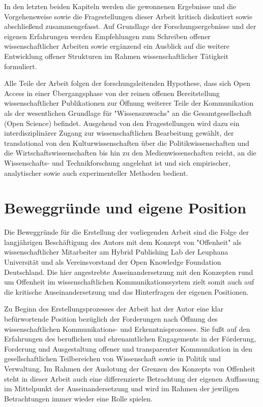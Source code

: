 In den letzten beiden Kapiteln werden die gewonnenen Ergebnisse und die Vorgehensweise sowie die Fragestellungen dieser Arbeit kritisch diskutiert sowie abschließend zusammengefasst. Auf Grundlage der Forschungsergebnisse und der eigenen Erfahrungen werden Empfehlungen zum Schreiben offener wissenschaftlicher Arbeiten sowie ergänzend ein Ausblick auf die weitere Entwicklung offener Strukturen im Rahmen wissenschaftlicher Tätigkeit formuliert.

Alle Teile der Arbeit folgen der forschungsleitenden Hypothese, dass sich Open Access in einer Übergangsphase von der reinen offenen Bereitstellung wissenschaftlicher Publikationen zur Öffnung weiterer Teile der Kommunikation als der wesentlichen Grundlage für "Wissenszuwachs" \cite[:157]{Luhmann_1998} an die Gesamtgesellschaft (Open Science) befindet. Ausgehend von den Fragestellungen wird dazu ein interdisziplinärer Zugang zur wissenschaftlichen Bearbeitung gewählt, der translational von den Kulturwissenschaften über die Politikwissenschaften und die Wirtschaftswissenschaften bis hin zu den Medienwissenschaften reicht, an die Wissenschafts- und Technikforschung angelehnt ist und sich empirischer, analytischer sowie auch experimenteller Methoden bedient.

\section{Beweggründe und eigene Position}

Die Beweggründe für die Erstellung der vorliegenden Arbeit sind die Folge der langjährigen Beschäftigung des Autors mit dem Konzept von "Offenheit" als wissenschaftlicher Mitarbeiter am Hybrid Publishing Lab der Leuphana Universität und als Vereinsvorstand der Open Knowledge Foundation Deutschland. Die hier angestrebte Auseinandersetzung mit den Konzepten rund um Offenheit im wissenschaftlichen Kommunikationssystem zielt somit auch auf die kritische Auseinandersetzung und das Hinterfragen der eigenen Positionen.

Zu Beginn des Erstellungsprozesses der Arbeit hat der Autor eine klar befürwortende Position bezüglich der Forderungen nach Öffnung des wissenschaftlichen Kommunikations- und Erkenntnisprozesses. Sie fußt auf den Erfahrungen des beruflichen und ehrenamtlichen Engagements in der Förderung, Forderung und Ausgestaltung offener und transparenter Kommunikation in den gesellschaftlichen Teilbereichen von Wissenschaft sowie in Politik und Verwaltung. Im Rahmen der Auslotung der Grenzen des Konzepts von Offenheit steht in dieser Arbeit auch eine differenzierte Betrachtung der eigenen Auffassung im Mittelpunkt der Auseinandersetzung und wird im Rahmen der jewiligen Betrachtungen immer wieder eine Rolle spielen.


